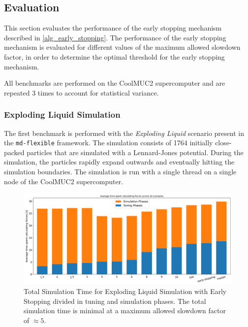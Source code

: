 \documentclass[conference]{IEEEtran}
\begin{document}
\subsection{Evaluation}
\label{sec:optimal_threshold}

This section evaluates the performance of the early stopping mechanism described in \autoref{alg_early_stopping}. The performance of the early stopping mechanism is evaluated for different values of the maximum allowed slowdown factor, in order to determine the optimal threshold for the early stopping mechanism.

All benchmarks are performed on the CoolMUC2 supercomputer  and are repeated 3 times to account for statistical variance.

\subsubsection{Exploding Liquid Simulation}

The first benchmark is performed with the \textit{Exploding Liquid} scenario present in the \texttt{md-flexible} framework. The simulation consists of 1764 initially close-packed particles that are simulated with a Lennard-Jones potential. During the simulation, the particles rapidly expand outwards and eventually hitting the simulation boundaries. The simulation is run with a single thread on a single node of the CoolMUC2 supercomputer.

\begin{figure}[H]
    \centering

    \includegraphics[width=\columnwidth]{../data/explodingLiquid/analytics/total_time_average.png}

    \caption{Total Simulation Time for Exploding Liquid Simulation with Early Stopping divided in tuning and simulation phases. The total simulation time is minimal at a maximum allowed slowdown factor of $\approx5$.}
\end{figure}
\end{document}

